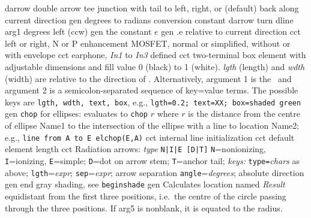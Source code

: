  {darrow}
  {double arrow tee junction with tail to left,
   right, or (default) back along current direction }
  {gen}
  {degrees to radians conversion constant}
  {darrow}
  {turn dline arg1 degrees left (ccw)}
%
  {gen}
  {the constant $e$}
  {gen}
  {.e relative to current direction}
  {cct}
  {left or right, N or P enhancement MOSFET, normal
   or simplified, without or with envelope
    }
  {cct}
  {earphone, {\sl In1} to {\sl In3} defined
   }
  {cct}
  { two-terminal box element with adjustable dimensions and fill
   value 0 (black) to 1 (white). {\sl lgth} (length) and {\sl wdth} (width)
   are relative
   to the direction of \linespec. Alternatively, argument 1 is the
   \linespec\ and argument 2 is a semicolon-separated sequence of key=value
   terms.  The possible keys are {\tt lgth, wdth, text, box},
   e.g., {\tt lgth=0.2; text=XX;
     box=shaded green}}
  {gen}
  {{\tt chop} for ellipses: evaluates to {\tt chop} $r$ where $r$ is
    the distance from the centre of ellipse Name1 to the intersection of
    the ellipse with a line to location Name2;
    e.g., {\tt line from A to E elchop(E,A)}}
  {cct}
  {internal line initialization}
  {cct}
  {default element length}
  {cct}
  { Radiation arrows: {\sl type} {\tt N|I|E [D|T]}
  {\tt N}=nonionizing, {\tt I}=ionizing, {\tt E}=simple;
  {\tt D}=dot on arrow stem; {\tt T}=anchor tail;
  {\sl keys:} {\tt type=}{\sl chars} as above;
  {\tt lgth}={\sl expr};
  {\tt sep}={\sl expr}; arrow separation
  {\tt angle}={\sl degrees}; absolute direction}
  {gen}
  {end gray shading, see {\tt beginshade}}
  {gen}
  {Calculates location named {\sl Result} equidistant from the first three
   positions, i.e.\ the centre of the circle passing through the three
   positions.  If arg5 is nonblank, it is equated to the radius.}
